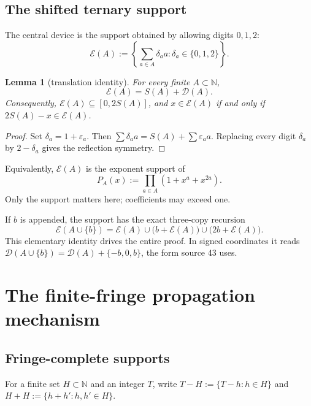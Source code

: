 \documentclass[11pt,a4paper]{article}
\numberwithin{equation}{section}
\newtheorem{lemma}[theorem]{Lemma}
\theoremstyle{definition}
\theoremstyle{remark}
\theoremstyle{plain}
\newcommand{\N}{\mathbb N}
\newcommand{\cD}{\mathcal D}
\newcommand{\cE}{\mathcal E}
\begin{document}
\subsection{The shifted ternary support}

The central device is the support obtained by allowing digits $0,1,2$:
\begin{equation}\label{gdf:eq:E-def}
 \cE(A):=\left\{\sum_{a\in A}\delta_a a:
                \delta_a\in\{0,1,2\}\right\}.
\end{equation}

\begin{lemma}[translation identity]\label{gdf:lem:E-translation}
For every finite $A\subset\N$,
\[
 \cE(A)=S(A)+\cD(A).
\]
Consequently, $\cE(A)\subseteq[0,2S(A)]$, and $x\in\cE(A)$ if and only if
$2S(A)-x\in\cE(A)$.
\end{lemma}

\begin{proof}
Set $\delta_a=1+\varepsilon_a$.  Then
$\sum\delta_a a=S(A)+\sum\varepsilon_a a$.  Replacing every digit
$\delta_a$ by $2-\delta_a$ gives the reflection symmetry.
\end{proof}

Equivalently, $\cE(A)$ is the exponent support of
\begin{equation}\label{gdf:eq:support-polynomial}
 P_A(x):=\prod_{a\in A}(1+x^a+x^{2a}).
\end{equation}
Only the support matters here; coefficients may exceed one.

If $b$ is appended, the support has the exact three-copy recursion
\begin{equation}\label{gdf:eq:three-copy}
 \cE(A\cup\{b\})=\cE(A)\cup\bigl(b+\cE(A)\bigr)
                    \cup\bigl(2b+\cE(A)\bigr).
\end{equation}
This elementary identity drives the entire proof.  In signed coordinates it
reads $\cD(A\cup\{b\})=\cD(A)+\{-b,0,b\}$, the form source 43 uses.

\section{The finite-fringe propagation mechanism}\label{gdf:sec:propagation}

\subsection{Fringe-complete supports}

For a finite set $H\subset\N$ and an integer $T$, write
$T-H:=\{T-h:h\in H\}$ and $H+H:=\{h+h':h,h'\in H\}$.
\end{document}
